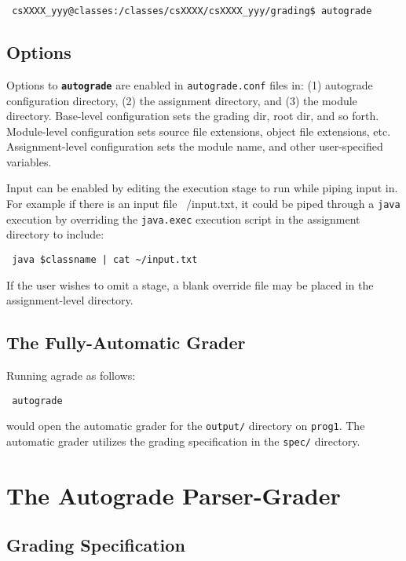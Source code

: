\documentclass{article}
\begin{document}
\begin{verbatim}
 csXXXX_yyy@classes:/classes/csXXXX/csXXXX_yyy/grading$ autograde
\end{verbatim}

\subsection{Options}

Options to \texttt{\textbf{autograde}} are enabled in \texttt{autograde.conf}
files in: (1) autograde configuration directory, (2) the assignment directory,
and (3) the module directory. Base-level configuration sets the grading dir,
root dir, and so forth. Module-level configuration sets source file extensions,
object file extensions, etc. Assignment-level configuration sets the module
name, and other user-specified variables. 

Input can be enabled by editing the execution stage to run while piping
input in.  For example if there is an input file ~/input.txt, it could
be piped through a \texttt{java} execution by overriding the \texttt{java.exec}
execution script in the assignment directory to include:

\begin{verbatim}
 java $classname | cat ~/input.txt
\end{verbatim}

If the user wishes to omit a stage, a blank override file may be placed
in the assignment-level directory.


\subsection{The Fully-Automatic Grader}

Running agrade as follows:

\begin{verbatim}
 autograde 
\end{verbatim}

would open the automatic grader for the \texttt{output/} directory on
\texttt{prog1}. The automatic grader utilizes the grading specification in the
\texttt{spec/} directory.

\section{The Autograde Parser-Grader}
\subsection{Grading Specification}
\end{document}
